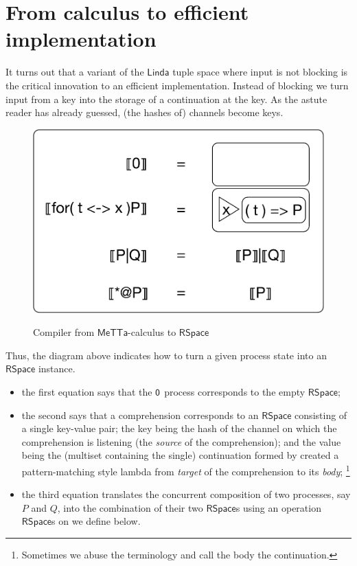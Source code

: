 \section{From calculus to efficient implementation}

It turns out that a variant of the $\mathsf{Linda}$ tuple space
\cite{DBLP:conf/parle/Gelernter89} where input is not blocking is the
critical innovation to an efficient implementation. Instead of
blocking we turn input from a key into the storage of a continuation
at the key. As the astute reader has already guessed, (the hashes of)
channels become keys.\\

\begin{figure}
  \centering
  \includegraphics[scale=0.5]{MeTTaCalcImpl1.pdf} \\
  \caption{Compiler from $\mathsf{MeTTa}$-calculus to $\mathsf{RSpace}$}
\end{figure}

Thus, the diagram above indicates how to turn a given process state
into an $\mathsf{RSpace}$ instance.

\begin{itemize}
  \item the first equation says that the $\mathsf{0}$ process corresponds
    to the empty $\mathsf{RSpace}$;
  \item the second says that a comprehension corresponds to an
    $\mathsf{RSpace}$ consisting of a single key-value pair; the key
    being the hash of the channel on which the comprehension is
    listening (the \emph{source} of the comprehension); and the value
    being the (multiset containing the single) continuation formed by
    created a pattern-matching style lambda from \emph{target} of the
    comprehension to its \emph{body}; \footnote{Sometimes we abuse the
      terminology and call the body the continuation.}
  \item the third equation translates the concurrent composition of
    two processes, say $P$ and $Q$, into the combination of their two
    $\mathsf{RSpace}$s using an operation $\mathsf{RSpace}$s on we
    define below.
\end{itemize}

